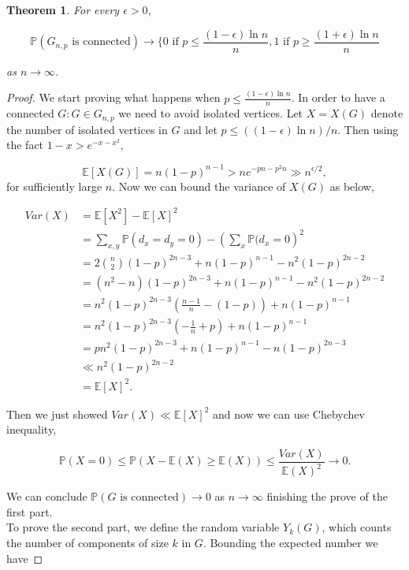 \documentclass[12pt,twoside,a4paper]{book}
\numberwithin{equation}{section}
\let\log=\ln
\newtheorem{theorem}             {Theorem}[section]
\theoremstyle{remark}
\begin{document}
\begin{theorem}
For every $\epsilon > 0$,

$$\mathbb{P}(G_{n,p}\text{ is connected}) \rightarrow \Bigg	 \{ 0\text{ if }p \leq \frac{(1 - \epsilon) \log n}{n} , 1 \text{ if } p \geq \frac{(1 + \epsilon) \log n}{n}$$

as $n \rightarrow \infty$.
\end{theorem}
\begin{proof}
We start proving what happens when $p \leq \frac{(1 - \epsilon) \log n}{n}$. In order to have a connected $G\colon G \in G_{n,p}$ we need to avoid isolated vertices. Let $X=X(G)$ denote the number of isolated vertices in $G$ and let $p\leq((1-\epsilon) \log n) /n$. Then using the fact $1-x > e^{-x-x^2}$,

$$ \mathbb{E}[X(G)] = n(1-p)^{n-1} > ne^{-pn-p^2n} \gg n^{\epsilon/2},$$
for sufficiently large $n$. Now we can bound the variance of $X(G)$ as below,

\begin{align*}
Var(X) &= \mathbb{E}[X^2 ] - \mathbb{E}[X]^2\\
&= \sum_{x,y} \mathbb{P}(d_x = d_y =0) - \left( \sum_x \mathbb{P}(d_x = 0\right)^2\\
& = 2\binom{n}{2} (1-p)^{2n-3} + n(1-p)^{n-1} - n^2(1-p)^{2n-2}\\
& = (n^2 - n)(1-p)^{2n-3} + n(1-p)^{n-1} - n^2(1-p)^{2n-2}\\
& = n^2(1-p)^{2n-3}\left( \frac{n-1}{n} - (1-p) \right) + n(1-p)^{n-1}\\
& = n^2(1-p)^{2n-3}\left( -\frac{1}{n} + p \right) + n(1-p)^{n-1}\\
& = pn^2 (1-p)^{2n-3} + n(1-p)^{n-1} - n(1-p)^{2n-3}\\
& \ll n^2 (1-p)^{2n-2}\\
& = \mathbb{E}[X]^2.
\end{align*}

Then we just showed $Var(X) \ll \mathbb{E}[X]^2$ and now we can use Chebychev  inequality,

$$\mathbb{P}(X=0) \leq \mathbb{P} (X-\mathbb{E}(X) \geq \mathbb{E}(X)) \leq \frac{Var(X)}{\mathbb{E}(X)^2} \rightarrow 0.$$

We can conclude $\mathbb{P}(G\text{ is connected}) \rightarrow 0$ as $n \rightarrow \infty$ finishing the prove of the first part.\\

To prove the second part, we define the random variable $Y_k(G)$, which counts the number of components of size $k$ in $G$. Bounding the expected number we have


\end{proof}
\end{document}
